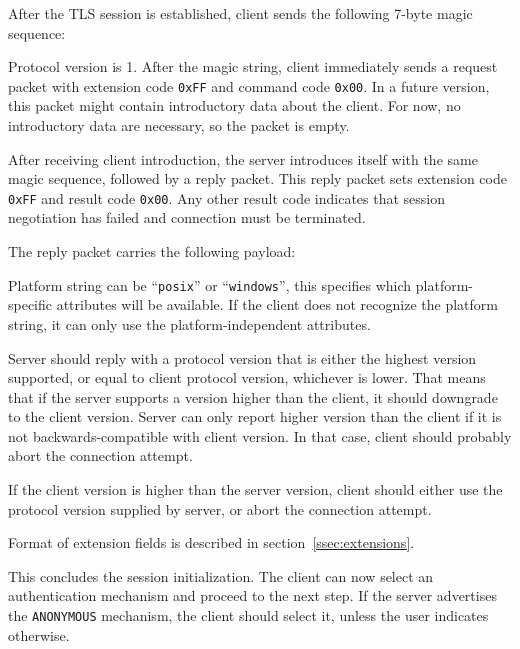After the TLS session is established, client sends the following 7-byte magic sequence:
\beginpk
\endpk

Protocol version is 1. After the magic string, client immediately sends a request packet with extension
code {\tt 0xFF} and command code {\tt 0x00}. In a future version, this packet might contain introductory data
about the client. For now, no introductory data are necessary, so the packet is empty.

After receiving client introduction, the server introduces itself with the same magic sequence, followed by
a reply packet. This reply packet sets extension code {\tt 0xFF} and result code {\tt 0x00}. Any other result
code indicates that session negotiation has failed and connection must be terminated.

The reply packet carries the following payload:
\beginpk
\endpk

Platform string can be ``{\tt posix}'' or ``{\tt windows}'', this specifies which platform-specific attributes
will be available. If the client does not recognize the platform string, it can only use the
platform-independent attributes.

Server should reply with a protocol version that is either the highest version supported, or equal to client
protocol version, whichever is lower. That means that if the server supports a version higher than the client,
it should downgrade to the client version. Server can only report higher version than the client if it is not
backwards-compatible with client version. In that case, client should probably abort the connection attempt.

If the client version is higher than the server version, client should either use the protocol version
supplied by server, or abort the connection attempt.

Format of extension fields is described in section~\ref{ssec:extensions}.

This concludes the session initialization. The client can now select an authentication mechanism and proceed
to the next step. If the server advertises the {\tt ANONYMOUS} mechanism, the client should select it, unless
the user indicates otherwise.

